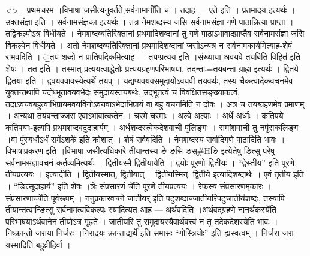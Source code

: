 \textless{}\textgreater{} - प्रथमचरम ।विभाषा
जसी॑त्यनुवर्तते,सर्वनामानी॑ति च । तदाह --- एते इति । प्रतमादय इत्यर्थः ।
उक्तसंज्ञा इति । सर्वनामसंज्ञका इत्यर्थः । तत्र नेमशब्दस्य जसि
सर्वनामसंज्ञा गणे पाठान्नित्या प्राप्ता । तद्विकल्पोऽत्र विधीयते ।
नेमशब्दव्यतिरिक्तानां प्रथमादिशब्दानां तु गणे पाठाऽभावादप्राप्तैव
सर्वनामसंज्ञा जसि विकल्पेन विधीयते । अतो नेमशब्दव्यतिरिक्तानां
प्रथमादिशब्दानां जसोऽन्यत्र न सर्वनामकार्यमित्याह-शेषं रामवदिति । ॒तय॑
शब्दो न प्रातिपदिकमित्याह --- तयप्प्रत्यय इति ।संख्याया अवयवे तयबिति
विहित॑ इति शेषः । तत इति । तस्मात् प्रत्ययत्वाद्धेतोः
प्रत्ययग्रहणपरिभाषया, तदन्ताः=तयबन्ता ग्राह्रा इत्यर्थः । द्वितये
द्वितया इति । द्ववयववावस्येत्यर्थे तयप् । यद्यप्यवयवसमुदायोऽवयवी
तयवर्थः, तस्य चैकत्वादेकवचनमेव युक्तन्तथापि यदोध्भूतावयवभेदः
समुदायस्तयबर्थः, उद्भूतत्वं च विवक्षितसङ्ख्याकत्वं,
तदाऽवयवबहुत्वाभिप्रायमवयविनोऽवयवाऽभेदाभिप्रायं वा बहु वचनमिति न दोषः ।
अत्र च तयब्ग्रहणमेव प्रमाणम् । अन्यथा तयबन्ताज्जस एवाऽभावात्कतेन । चरमे
चरमाः । अल्पे अल्पाः । अर्धे अर्धाः । कतिपये कतिपयाः-इत्यपि
प्रथमशब्दवदुदाहार्यम् । अर्धशब्दस्त्वेकदेशवाची पुंलिङ्गः । समांशवाची तु
नपुंसकलिङ्गः ।वा पुंस्यर्धोऽर्धं समेंऽशके॑ इति कोशात् । शेषं सर्ववदिति ।
नेमशब्दस्य सर्वादिगणे पाठादिति भावः । विभाषाप्रकरण इति ।विभाषा
जसी॑त्यधिकारे तीयान्तस्य ङे-ङसि-ङस्\#Hङि-इत्येतेषु ङित्सु परेषु
सर्वनामसंज्ञावचनं कर्तव्यमित्यर्थः । द्वितीयस्मै द्वितीयायेति । द्वयोः
पूरणो द्वितीयः । ``द्वेस्तीय'' इति पूरणे तीयप्रत्ययः । इत्यादीति ।
द्वितीयस्मात्, द्वितीयात् । द्वितीयस्मिन्, द्वितीये इत्यादिशब्दार्थः ।
एवं तृतीय इति । ``ङित्सूदाहार्य'' इति शेषः ।त्रेः संप्रसारणं चे॑ति पूरणे
तीयप्रत्ययः । रेफस्य संप्रसारणमृकारः ।संप्रसारणाच्चे॑ति पूर्वरूपम् ।
ननुप्रकारवचने जातीयर् इति पटुशब्दाज्जातीयरिपटुजातीय॑शब्दः, तस्यापि
तीयान्तत्वान्ङित्सु सर्वनामत्वविकल्पः स्यादित्यत आह --- अर्थवदिति
।अर्थवद्ग्रहणे नानर्थकस्ये॑ति परिभाषयाऽर्थवानेन तीयोऽत्र गृह्रते ।
जातीयरि तु समुदायस्यैवार्थवत्त्वं न तु तदेकदेशस्येति भावः । निष्क्रान्तो
जराया निर्जरः ।निरादयः क्रान्ताद्यर्थे॑ इति समासः ``गोस्त्रियोः'' इति
ह्यस्वत्वम् । निर्जरा जरा यस्मादिति बहुव्रीहिर्वा ।
